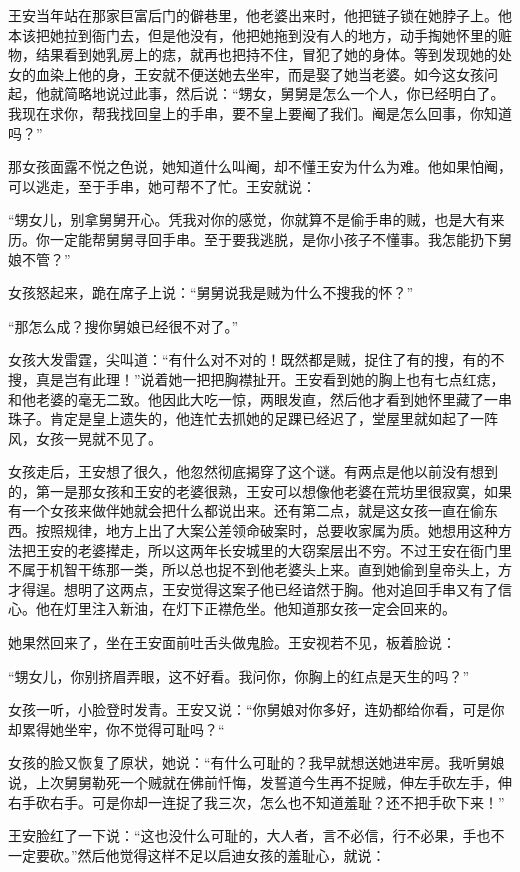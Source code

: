 王安当年站在那家巨富后门的僻巷里，他老婆出来时，他把链子锁在她脖子上。他本该把她拉到衙门去，但是他没有，他把她拖到没有人的地方，动手掏她怀里的赃物，结果看到她乳房上的痣，就再也把持不住，冒犯了她的身体。等到发现她的处女的血染上他的身，王安就不便送她去坐牢，而是娶了她当老婆。如今这女孩问起，他就简略地说过此事，然后说：“甥女，舅舅是怎么一个人，你已经明白了。我现在求你，帮我找回皇上的手串，要不皇上要阉了我们。阉是怎么回事，你知道吗？” 

那女孩面露不悦之色说，她知道什么叫阉，却不懂王安为什么为难。他如果怕阉，可以逃走，至于手串，她可帮不了忙。王安就说： 

“甥女儿，别拿舅舅开心。凭我对你的感觉，你就算不是偷手串的贼，也是大有来历。你一定能帮舅舅寻回手串。至于要我逃脱，是你小孩子不懂事。我怎能扔下舅娘不管？” 

女孩怒起来，跪在席子上说：“舅舅说我是贼为什么不搜我的怀？” 

“那怎么成？搜你舅娘已经很不对了。” 

女孩大发雷霆，尖叫道：“有什么对不对的！既然都是贼，捉住了有的搜，有的不搜，真是岂有此理！”说着她一把把胸襟扯开。王安看到她的胸上也有七点红痣，和他老婆的毫无二致。他因此大吃一惊，两眼发直，然后他才看到她怀里藏了一串珠子。肯定是皇上遗失的，他连忙去抓她的足踝已经迟了，堂屋里就如起了一阵风，女孩一晃就不见了。 

女孩走后，王安想了很久，他忽然彻底揭穿了这个谜。有两点是他以前没有想到的，第一是那女孩和王安的老婆很熟，王安可以想像他老婆在荒坊里很寂寞，如果有一个女孩来做伴她就会把什么都说出来。还有第二点，就是这女孩一直在偷东西。按照规律，地方上出了大案公差领命破案时，总要收家属为质。她想用这种方法把王安的老婆撵走，所以这两年长安城里的大窃案层出不穷。不过王安在衙门里不属于机智干练那一类，所以总也捉不到他老婆头上来。直到她偷到皇帝头上，方才得逞。想明了这两点，王安觉得这案子他已经谙然于胸。他对追回手串又有了信心。他在灯里注入新油，在灯下正襟危坐。他知道那女孩一定会回来的。 

她果然回来了，坐在王安面前吐舌头做鬼脸。王安视若不见，板着脸说： 

“甥女儿，你别挤眉弄眼，这不好看。我问你，你胸上的红点是天生的吗？” 

女孩一听，小脸登时发青。王安又说：“你舅娘对你多好，连奶都给你看，可是你却累得她坐牢，你不觉得可耻吗？“ 

女孩的脸又恢复了原状，她说：“有什么可耻的？我早就想送她进牢房。我听舅娘说，上次舅舅勒死一个贼就在佛前忏悔，发誓道今生再不捉贼，伸左手砍左手，伸右手砍右手。可是你却一连捉了我三次，怎么也不知道羞耻？还不把手砍下来！” 

王安脸红了一下说：“这也没什么可耻的，大人者，言不必信，行不必果，手也不一定要砍。”然后他觉得这样不足以启迪女孩的羞耻心，就说： 

